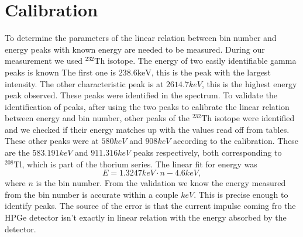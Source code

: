 \documentclass[pdftex,12pt,a4paper]{article}
\begin{document}
	\section{Calibration}
		To determine the parameters of the linear relation between bin number and energy peaks with known energy are needed to be measured. During our measurement we used $^{232}\text{Th}$ isotope. The energy of two easily identifiable gamma peaks is known The first one is $238.6\text{keV}$, this is the peak with the largest intensity. The other characteristic peak is at $2614.7keV$, this is the highest energy peak observed. These peaks were identified in the spectrum. To validate the identification of peaks, after using the two peaks to calibrate the linear relation between energy and bin number, other peaks of the $^{232}\text{Th}$ isotope were identified and we checked if their energy matches up with the values read off from tables. These other peaks were at $580keV$ and $908keV$ according to the calibration. These are the $583.191keV$ and $911.316keV$ peaks respectively, both corresponding to $^{208}\text{Tl}$, which is part of the thorium series. The linear fit for energy was
		\begin{equation}
			E = 1.3247keV \cdot n - 4.6keV,
		\end{equation}
		where $n$ is the bin number. From the validation we know the energy measured from the bin number is accurate within a couple $keV$. This is precise enough to identify peaks. The source of the error is that the current impulse coming fro the HPGe detector isn't exactly in linear relation with the energy absorbed by the detector.
\end{document}
